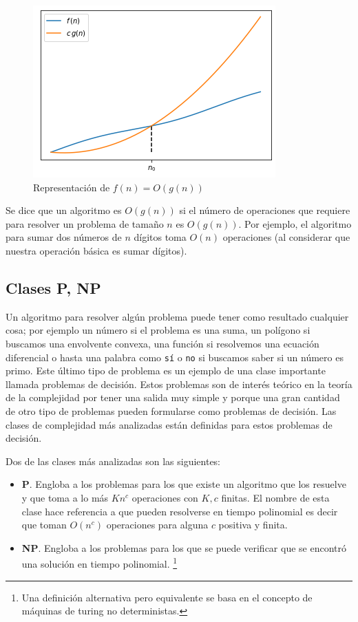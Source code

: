\begin{figure}[H]
    \centering
    \includegraphics[scale=.8]{Imagenes/bigo.png}
    \caption{Representación de $f(n)= O(g(n))$}
    \label{fig:bigo}
\end{figure}

Se dice que un algoritmo es $O(g(n))$ si el número de operaciones que requiere para resolver un problema de tamaño $n$ es $O(g(n))$.
%
Por ejemplo, el algoritmo para sumar dos números de $n$ dígitos toma $O(n)$ operaciones (al considerar que nuestra operación básica es sumar dígitos).

\subsection*{Clases \textbf{P}, \textbf{NP} }
Un algoritmo para resolver algún problema puede tener como resultado cualquier cosa; por ejemplo un número si el problema es una suma, un polígono si buscamos una envolvente convexa, una función si resolvemos una ecuación diferencial o hasta una palabra como \texttt{sí} o \texttt{no} si buscamos saber si un número es primo.
%
Este último tipo de problema es un ejemplo de una clase importante llamada problemas de decisión. Estos problemas son de interés teórico en la teoría de la complejidad por tener una salida muy simple y porque una gran cantidad de otro tipo de problemas pueden formularse como problemas de decisión. 
%
Las clases de complejidad más analizadas están definidas para estos problemas de decisión.

Dos de las clases más analizadas son las siguientes:

\begin{itemize} 
    \item \textbf{P}. Engloba a los problemas para los que existe un algoritmo que los resuelve y que toma a lo más $Kn^c$ operaciones con $K,c$ finitas. 
		El nombre de esta clase hace referencia a que pueden resolverse en tiempo polinomial es decir que toman $O(n^c)$ operaciones para alguna $c$ positiva y finita. 

    \item \textbf{NP}. Engloba a los problemas para los que se puede verificar que se encontró una solución en tiempo polinomial. \footnote{Una definición alternativa pero equivalente se basa en el concepto de máquinas de turing no deterministas.}
\end{itemize}

